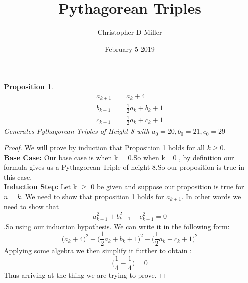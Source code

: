 \documentclass[12pt]{article}
\title{Pythagorean Triples}
\author{Christopher D Miller}
\date{February 5 2019}
\theoremstyle{plain}
\newtheorem{proposition}{Proposition}
\begin{document}
\maketitle
\begin{proposition}
    \begin{align*}
        a_{k+1} &= a_{k} +4\\ 
        b_{k+1} &= \frac{1}{2} a_{k} + b_{k} +1\\
        c_{k+1} &= \frac{1}{2}a_k + c_k +1
    \end{align*}
    Generates Pythagorean Triples of Height 8 with $a_0=20,b_0 = 21,c_0 = 29$
    
\end{proposition}
\begin{proof}     
We will prove by induction that Proposition 1 holds for all $k \geq 0$.\\\textbf{Base Case:} Our base case is when k = 0.So when k =0 , by definition our formula gives us a Pythagorean Triple of height 8.So our proposition is true in this case.\\
\textbf{Induction Step:} Let k $\geq$ 0 be given and suppose our proposition is true for $n=k$. We need to show that proposition 1 holds for $a_{k+1}$. In other words we need to show that $$a_{k+1}^2+b_{k+1}^2 - c_{k+1}^2 = 0$$.So using our induction hypothesis. We can write it in the following form:
$$\big( a_{k} +4\big)^2 + \big( \frac{1}{2} a_{k} + b_{k} +1 \big)^2 - \big( \frac{1}{2}a_k + c_k +1\big)^2 $$ 
Applying some algebra we then simplify it further  to obtain : $$\big( \frac{1}{4} - \frac{1}{4} \big)=0$$
Thus arriving at the thing we are trying to prove. 
\end{proof}
\end{document}
